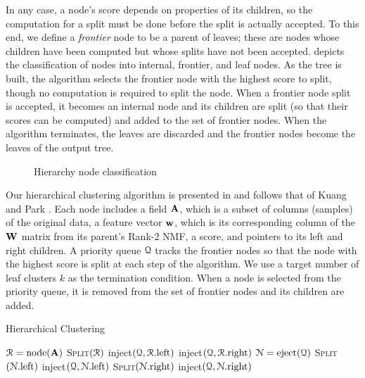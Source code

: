 \documentclass[conference,compsoc]{IEEEtran}
\begin{document}
In any case, a node's score depends on properties of its children, so the computation for a split must be done before the split is actually accepted.
To this end, we define a \emph{frontier} node to be a parent of leaves; these are nodes whose children have been computed but whose splits have not been accepted.
 depicts the classification of nodes into internal, frontier, and leaf nodes.
As the tree is built, the algorithm selects the frontier node with the highest score to split, though no computation is required to split the node.
When a frontier node split is accepted, it becomes an internal node and its children are split (so that their scores can be computed) and added to the set of frontier nodes.
When the algorithm terminates, the leaves are discarded and the frontier nodes become the leaves of the output tree.

\begin{figure}

\caption{Hierarchy node classification}
\label{fig:tree}
\end{figure}

Our hierarchical clustering algorithm is presented in  and follows that of Kuang and Park \cite{KP13}.
Each node includes a field $\M{A}$, which is a subset of columns (samples) of the original data, a feature vector $\V{w}$, which is its corresponding column of the $\M{W}$ matrix from its parent's Rank-2 NMF, a score, and pointers to its left and right children.
A priority queue $\cal Q$ tracks the frontier nodes so that the node with the highest score is split at each step of the algorithm.
We use a target number of leaf clusters $k$ as the termination condition.
When a node is selected from the priority queue, it is removed from the set of frontier nodes and its children are added.

\begin{algorithm}
\caption{Hierarchical Clustering \cite{KP13}}
\label{alg:hiernmf2}
\begin{algorithmic}[1]
		\State ${\cal R} = \text{node}(\M{A})$ \hfill {}
		\State \textsc{Split}$({\cal R})$
		\State inject$({\cal Q},{\cal R}.\text{left})$ \hfill {}
		\State inject$({\cal Q},{\cal R}.\text{right})$ \hfill {}
			\State ${\cal N} = \text{eject}({\cal Q})$ \hfill {}
			\State \textsc{Split}$({\cal N}.\text{left})$ \hfill {}
			\State inject$({\cal Q},{\cal N}.\text{left})$ \hfill {}
			\State \textsc{Split}$({\cal N}.\text{right})$ \hfill {}
			\State inject$({\cal Q},{\cal N}.\text{right})$ \hfill {}
		\EndWhile
	\EndFunction
\end{algorithmic}
\end{algorithm}
\end{document}
